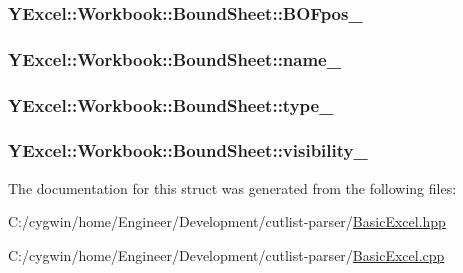 \subsubsection[{B\+O\+Fpos\+\_\+}]{ Y\+Excel\+::\+Workbook\+::\+Bound\+Sheet\+::\+B\+O\+Fpos\+\_\+}\label{struct_y_excel_1_1_workbook_1_1_bound_sheet_acef056c4060806736aeb519580b50342}
\hypertarget{struct_y_excel_1_1_workbook_1_1_bound_sheet_aad8f841da0db30cf1981b0ec84c71f63}{}
\subsubsection[{name\+\_\+}]{ Y\+Excel\+::\+Workbook\+::\+Bound\+Sheet\+::name\+\_\+}\label{struct_y_excel_1_1_workbook_1_1_bound_sheet_aad8f841da0db30cf1981b0ec84c71f63}
\hypertarget{struct_y_excel_1_1_workbook_1_1_bound_sheet_a6e7b56ac49d75d6d38ad98794925ada4}{}
\subsubsection[{type\+\_\+}]{ Y\+Excel\+::\+Workbook\+::\+Bound\+Sheet\+::type\+\_\+}\label{struct_y_excel_1_1_workbook_1_1_bound_sheet_a6e7b56ac49d75d6d38ad98794925ada4}
\hypertarget{struct_y_excel_1_1_workbook_1_1_bound_sheet_ae59ccb1998e05fb32b4df9217144b8bd}{}
\subsubsection[{visibility\+\_\+}]{ Y\+Excel\+::\+Workbook\+::\+Bound\+Sheet\+::visibility\+\_\+}\label{struct_y_excel_1_1_workbook_1_1_bound_sheet_ae59ccb1998e05fb32b4df9217144b8bd}


The documentation for this struct was generated from the following files\+:\begin{DoxyCompactItemize}
\item 
C\+:/cygwin/home/\+Engineer/\+Development/cutlist-\/parser/\hyperlink{_basic_excel_8hpp}{Basic\+Excel.\+hpp}\item 
C\+:/cygwin/home/\+Engineer/\+Development/cutlist-\/parser/\hyperlink{_basic_excel_8cpp}{Basic\+Excel.\+cpp}\end{DoxyCompactItemize}
